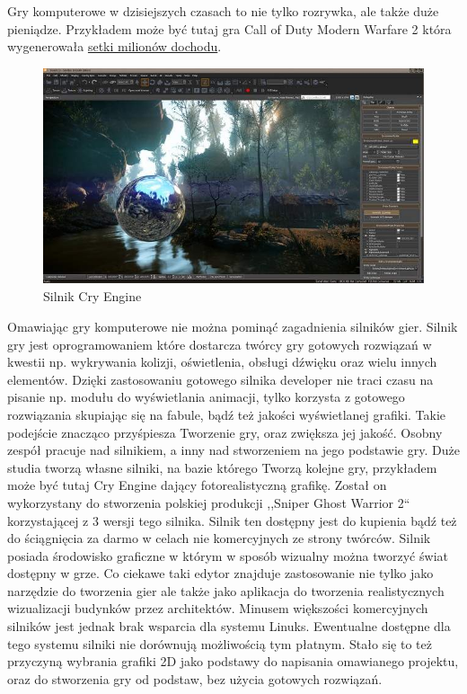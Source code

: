 Gry komputerowe w dzisiejszych czasach to nie tylko rozrywka, ale także duże pieniądze. Przykładem może być tutaj gra Call of Duty Modern Warfare 2 która wygenerowała \href{http://www.cdaction.pl/news-10119/wiedziales-call-of-duty-wygenerowalo-3-miliardy--dolarow-przychodu.html}{setki milionów dochodu}.
 
\begin{figure}[h]
    \centering
    \includegraphics[height=240px]{./Pictures/cryengine.jpg}
    \caption{Silnik Cry Engine}
\end{figure}
  
Omawiając gry komputerowe nie można pominąć zagadnienia silników gier. Silnik gry jest oprogramowaniem które dostarcza twórcy gry gotowych rozwiązań w kwestii np. wykrywania kolizji, oświetlenia, obsługi dźwięku oraz wielu innych elementów. Dzięki zastosowaniu gotowego silnika developer nie traci czasu na pisanie np. modułu do wyświetlania animacji, tylko korzysta z gotowego rozwiązania skupiając się na fabule, bądź też jakości wyświetlanej grafiki. Takie podejście znacząco przyśpiesza Tworzenie gry, oraz zwiększa jej jakość. Osobny zespół pracuje nad silnikiem, a inny nad stworzeniem na jego podstawie gry. Duże studia tworzą własne silniki, na bazie którego Tworzą kolejne gry, przykładem może być tutaj Cry Engine dający fotorealistyczną grafikę. Został on wykorzystany do stworzenia polskiej produkcji ,,Sniper Ghost Warrior 2`` korzystającej z  3 wersji tego silnika. Silnik ten dostępny jest do kupienia bądź też do ściągnięcia za darmo w celach nie komercyjnych ze strony twórców. Silnik posiada środowisko graficzne w którym w sposób wizualny można tworzyć świat dostępny w grze. Co ciekawe taki edytor znajduje zastosowanie nie tylko jako narzędzie do tworzenia gier ale także jako aplikacja do tworzenia realistycznych wizualizacji budynków przez architektów. Minusem większości komercyjnych silników jest jednak brak wsparcia dla systemu Linuks. Ewentualne dostępne dla tego systemu silniki nie dorównują możliwością tym płatnym. Stało się to też przyczyną wybrania grafiki 2D jako podstawy do napisania omawianego projektu, oraz do stworzenia gry od podstaw, bez użycia gotowych rozwiązań. 

